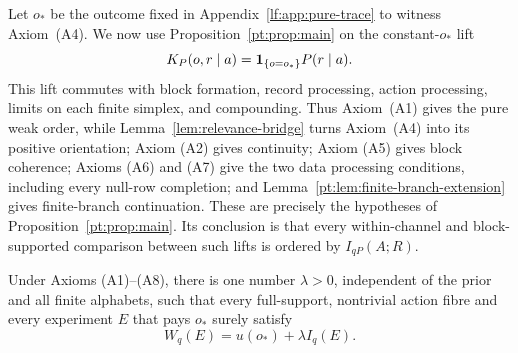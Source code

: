 Let $o_\ast$ be the outcome fixed in Appendix~\ref{lf:app:pure-trace} to
witness Axiom~\textup{(A4)}.  We now use Proposition~\ref{pt:prop:main} on the
constant-$o_\ast$ lift
\[
K_P(o,r\mid a)=\mathbf 1_{\{o=o_\ast\}}P(r\mid a).
\]
This lift commutes with block formation, record processing, action processing,
limits on each finite simplex, and compounding.  Thus Axiom~\textup{(A1)} gives
the pure weak order, while Lemma~\ref{lem:relevance-bridge} turns
Axiom~\textup{(A4)} into its positive orientation; Axiom \textup{(A2)} gives continuity; Axiom \textup{(A5)} gives
block coherence; Axioms \textup{(A6)} and \textup{(A7)} give the two data
processing conditions, including every null-row completion; and
Lemma~\ref{pt:lem:finite-branch-extension} gives finite-branch continuation.  These are precisely the
hypotheses of Proposition~\ref{pt:prop:main}.  Its conclusion is that every
within-channel and block-supported comparison between such lifts is ordered by
$I_{qP}(A;R)$.

\begin{lemma}\label{lf:lem:trace-scale}
Under Axioms \textup{(A1)--(A8)}, there is one number $\lambda>0$, independent
of the prior and all finite alphabets, such that every full-support,
nontrivial action fibre and every experiment $E$ that pays $o_\ast$ surely satisfy
\begin{equation}
W_q(E)=u(o_\ast)+\lambda I_q(E).
\label{lf:eq:sure-anchor}
\end{equation}
\end{lemma}

